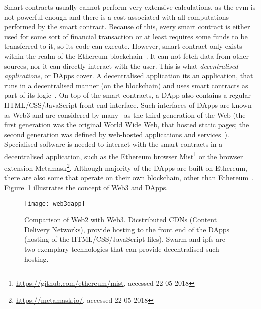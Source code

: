Smart contracts usually cannot perform very extensive calculations, as the \acrshort{evm} is not powerful enough and there is a cost associated with all computations performed by the smart contract. Because of this, every smart contract is either used for some sort of financial transaction or at least requires some funds to be transferred to it, so its code can execute. However, smart contract only exists within the realm of the Ethereum blockchain~\cite{JohnWeldon2016BuildingContract}. It can not fetch data from other sources, nor it can directly interact with the user. This is what \textit{decentralised applications}, or DApps cover. A decentralised application its an application, that runs in a decentralised manner (on the blockchain) and uses smart contracts as part of its logic~\cite[p. 149]{Dannen2017IntroducingSolidity}. On top of the smart contracts, a DApp also contains a regular HTML/CSS/JavaScript front end interface. Such interfaces of DApps are known as Web3 and are considered by many~\cite{Dannen2017IntroducingSolidity, LukeHedger2017CrossingDevelopment} as the third generation of the Web (the first generation was the original World Wide Web, that hosted static pages; the second generation was defined by web-hosted applications and services~\cite{Dannen2017IntroducingSolidity}). Specialised software is needed to interact with the smart contracts in a decentralised application, such as the Ethereum browser Mist\footnote{\url{https://github.com/ethereum/mist}, accessed 22-05-2018} or the browser extension Metamask\footnote{\url{https://metamask.io/}, accessed 22-05-2018}. Although majority of the DApps are built on Ethereum, there are also some that operate on their own blockchain, other than Ethereum~\cite{AlyssaHertigWhatCoinDesk}. Figure~\ref{fig:web3} illustrates the concept of Web3 and DApps.

\begin{figure}
    \centering
    \texttt{[image: web3dapp]}
    \caption{Comparison of Web2 with Web3. Dicstributed CDNs (Content Delivery Networks), provide hosting to the front end of the DApps (hosting of the HTML/CSS/JavaScript files). Swarm and \acrfull{ipfs} are two exemplary technologies that can provide decentralised such hosting.}
    \label{fig:web3}
\end{figure}